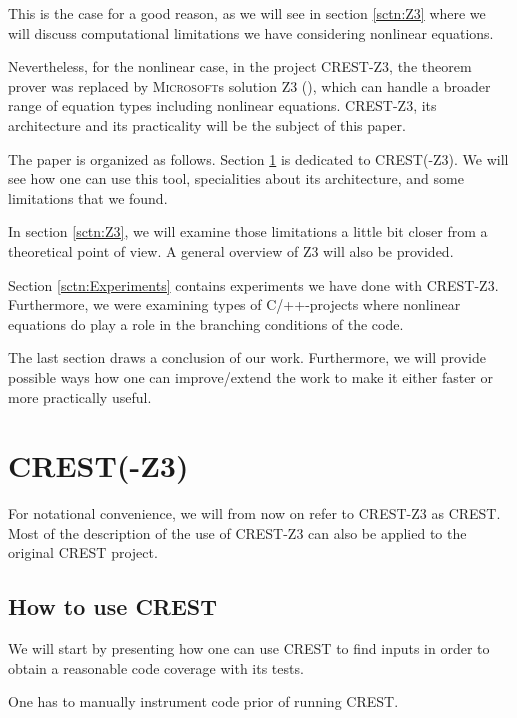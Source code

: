 \documentclass[oribibl]{llncs}
\begin{document}
This is the case for a good reason, as we will see in section \ref{sctn:Z3} where we will discuss computational limitations we have
considering nonlinear equations.

Nevertheless, for the nonlinear case, in the project \textsc{CREST-Z3}, the theorem prover was replaced
by \textsc{Microsoft}s solution \textsc{Z3}
(\cite{de2008z3}), which can handle a broader range of equation types
including nonlinear equations. \textsc{CREST-Z3}, its architecture and
its practicality will be the subject of this paper.

The paper is organized as follows. Section \ref{sctn:CRESTZ3} is
dedicated to \textsc{CREST}(-\textsc{Z3}). We will see how one can use
this tool, specialities about its architecture, and some limitations
that we found.

In section \ref{sctn:Z3}, we will examine those limitations a little
bit closer from a theoretical point of view. A general overview of
\textsc{Z3} will also be provided.

Section \ref{sctn:Experiments} contains experiments we have done with
\textsc{CREST-Z3}. Furthermore, we were examining types of \textsc{C/++}-projects
where nonlinear equations do play a role in the branching conditions
of the code.

The last section draws a conclusion of our work. Furthermore, we will
provide possible ways how one can improve/extend the work to make it
either faster or more practically useful.


\section{\textsc{CREST}(-\textsc{Z3})}
\label{sctn:CRESTZ3}

For notational convenience, we will from now on refer to
\textsc{CREST-Z3} as \textsc{CREST}. Most of the description of the
use of \textsc{CREST-Z3} can also be applied to the original
\textsc{CREST} project.

\subsection{How to use \textsc{CREST}}
We will start by presenting how one can use \textsc{CREST} to find
inputs in order to obtain a reasonable code coverage with its tests.

One has to manually instrument code prior of running \textsc{CREST}.
\end{document}
